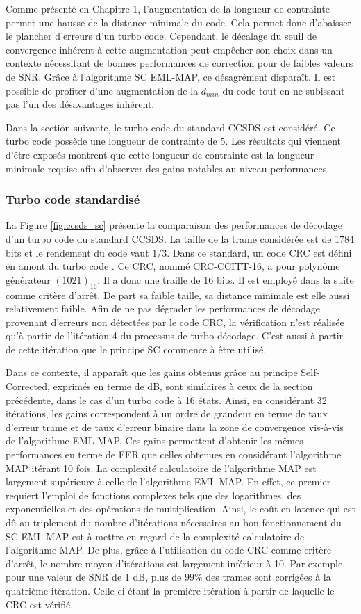 Comme présenté en Chapitre 1, l'augmentation de la longueur de contrainte permet une hausse de la distance minimale du code.
Cela permet donc d'abaisser le plancher d'erreurs d'un turbo code. Cependant, le décalage du seuil de 
convergence inhérent à cette augmentation peut empêcher son choix dans un contexte nécessitant de bonnes performances de 
correction pour de faibles valeurs de SNR. Grâce 
à l’algorithme SC EML-MAP, ce désagrément disparaît. Il est possible de profiter d'une augmentation de la 
$d_{min}$ du code tout en ne subissant pas l'un des désavantages inhérent.

Dans la section suivante, le turbo code du standard CCSDS est considéré. Ce turbo code possède une longueur de 
contrainte de $5$. Les résultats qui viennent d'être exposés montrent que cette longueur de contrainte est la 
longueur minimale requise afin d'observer des gains notables au niveau performances. 

\subsubsection{Turbo code standardisé}
La Figure \ref{fig:ccsds_sc} présente la comparaison des performances de décodage d'un turbo code du standard CCSDS. 
La taille de la trame considérée est de 1784 bits et le rendement du code vaut $1/3$. Dans ce standard, un code CRC est 
défini en amont du turbo code \cite{ccsdsBluebook}. Ce CRC, nommé CRC-CCITT-16, a pour polynôme générateur $(1021)_{16}$. 
Il a donc une traille de 16 bits. Il est employé dans la suite comme critère d'arrêt. De part sa faible taille, sa distance 
minimale est elle aussi relativement faible. Afin de ne pas dégrader les performances de décodage provenant d'erreurs 
non détectées par le code CRC, la vérification n'est réalisée qu'à partir de l'itération 4 du processus de turbo décodage.
C'est aussi à partir de cette itération que le principe SC commence à être utilisé.

Dans ce contexte, il apparaît que les gains obtenus grâce au principe Self-Corrected, exprimés en terme de dB, sont similaires à ceux de la 
section précédente, dans le cas d'un turbo code à 16 états. Ainsi, en considérant 32 itérations, les gains correspondent à un ordre de grandeur en 
terme de taux d'erreur trame et de taux d'erreur binaire dans la zone de convergence vis-à-vis de l'algorithme EML-MAP. 
Ces gains permettent d'obtenir les mêmes performances en terme de FER que celles obtenues en considérant l'algorithme 
MAP itérant 10 fois. La complexité calculatoire de l’algorithme MAP 
est largement supérieure à celle de l'algorithme EML-MAP. En effet, ce premier requiert l’emploi de fonctions complexes 
tels que des logarithmes, des exponentielles et des opérations de multiplication. Ainsi, le coût en latence qui est dû 
au triplement du nombre d'itérations nécessaires au bon fonctionnement du SC 
EML-MAP est à mettre en regard de la complexité calculatoire de l'algorithme MAP. 
De plus, grâce à l'utilisation du code CRC comme critère d'arrêt, le nombre moyen d'itérations est largement inférieur à 10. 
Par exemple, pour une valeur de SNR de 1 dB, plus de $99\%$ des trames sont corrigées à la quatrième itération. Celle-ci étant la première 
itération à partir de laquelle le CRC est vérifié. 

